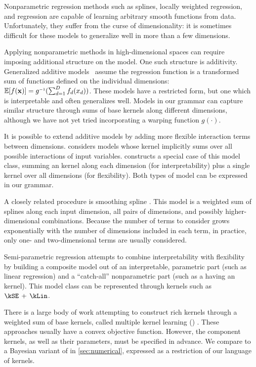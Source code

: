 Nonparametric regression methods such as splines, locally weighted regression, and \gp{} regression are capable of learning arbitrary smooth functions from data.
Unfortunately, they suffer from the curse of dimensionality: it is sometimes difficult for these models to generalize well in more than a few dimensions.

Applying nonparametric methods in high-dimensional spaces can require imposing additional structure on the model.
One such structure is additivity.
Generalized additive models~\citep{hastie1990generalized} assume the regression function is a transformed sum of functions defined on the individual dimensions: $\expect[f(\vx)] = g\inv(\sum_{d=1}^D f_d(x_d))$.
These models have a restricted form, but one which is interpretable and often generalizes well.
Models in our grammar can capture similar structure through sums of base kernels along different dimensions, although we have not yet tried incorporating a warping function $g(\cdot)$.

It is possible to extend additive models by adding more flexible interaction terms between dimensions. 
 considers \gp{} models whose kernel implicitly sums over all possible interactions of input variables.
\citet{plate1999accuracy} constructs a special case of this model class, summing an \kSE{} kernel along each dimension (for interpretability) plus a single \seard{} kernel over all dimensions (for flexibility).
Both types of model can be expressed in our grammar.

A closely related procedure is smoothing spline \ANOVA{} \citep{wahba1990spline, gu2002smoothing}.
This model is a weighted sum of splines along each input dimension, all pairs of dimensions, and possibly higher-dimensional combinations.
Because the number of terms to consider grows exponentially with the number of dimensions included in each term, in practice, only one- and two-dimensional terms are usually considered.

Semi-parametric regression \citep[e.g.][]{ruppert2003semiparametric} attempts to combine interpretability with flexibility by building a composite model out of an interpretable, parametric part (such as linear regression) and a ``catch-all'' nonparametric part (such as a \gp{} having an \kSE{} kernel).
This model class can be represented through kernels such as ${\kSE \kernplus \kLin}$.


There is a large body of work attempting to construct rich kernels through a weighted sum of base kernels, called multiple kernel learning (\MKL{}) \citep[e.g.][]{gonen2011multiple, bach2004multiple}.
These approaches usually have a convex objective function.
However, the component kernels, as well as their parameters, must be specified in advance.
We compare to a Bayesian variant of \MKL{} in \cref{sec:numerical}, expressed as a restriction of our language of kernels.

